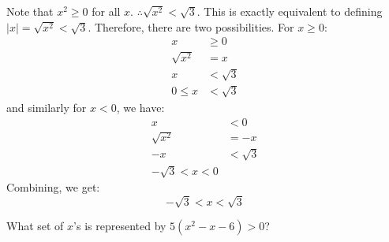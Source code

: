 \begin{itemize}
\begin{example}
\begin{center}
        \end{center}
        Note that $x^2 \ge 0$ for all $x$. $\therefore \sqrt{x^2}<\sqrt{3}$. This is exactly equivalent to defining $|x|=\sqrt{x^2}<\sqrt{3}$. Therefore, there are two possibilities. For $x\ge 0$:
        \begin{align}
            x &\ge 0 \\ 
            \sqrt{x^2} &= x \\ 
            x &< \sqrt{3} \\ 
            0\le x &< \sqrt{3}
        \end{align}
        and similarly for $x< 0$, we have:
        \begin{align}
            x &< 0 \\ 
            \sqrt{x^2} &= -x \\
            -x &< \sqrt{3} \\ 
            -\sqrt{3} < x < 0
        \end{align}
        Combining, we get:
        \begin{equation}
            -\sqrt{3}<x<\sqrt{3}
            \label{eq:}
        \end{equation}
    \end{example}
    \begin{example}
        What set of $x$'s is represented by $5(x^2-x-6)>0$?
        \vspace{2mm}


\end{example}
\end{itemize}
